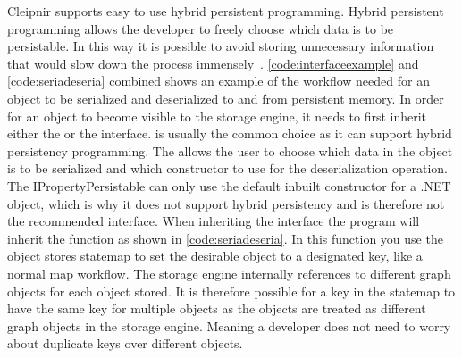 Cleipnir supports easy to use hybrid persistent programming. Hybrid persistent programming allows the developer to freely choose which data is to be persistable. In this way it is possible to avoid storing unnecessary information that would slow down the process immensely~\cite[p.~9-10]{PAPER:PaxosCleipnir}. \autoref{code:interfaceexample} and \autoref{code:seriadeseria} combined shows an example of the workflow needed for an object to be serialized and deserialized to and from persistent memory. In order for an object to become visible to the storage engine, it needs to first inherit either the  or the  interface.  is usually the common choice as it can support hybrid persistency programming. The  allows the user to choose which data in the object is to be serialized and which constructor to use for the deserialization operation. The IPropertyPersistable can only use the default inbuilt constructor for a .NET object, which is why it does not support hybrid persistency and is therefore not the recommended interface.
When inheriting the  interface the program will inherit the  function as shown in \autoref{code:seriadeseria}. In this function you use the object stores statemap to set the desirable object to a designated key, like a normal map workflow. The storage engine internally references to different graph objects for each object stored. It is therefore possible for a key in the statemap to have the same key for multiple objects as the objects are treated as different graph objects in the storage engine. Meaning a developer does not need to worry about duplicate keys over different objects.

